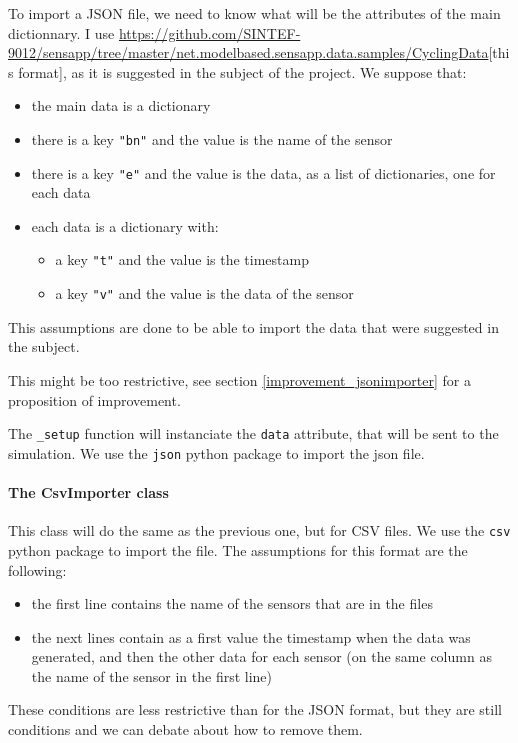 To import a JSON file, we need to know what will be the attributes of the main dictionnary. I use \url{https://github.com/SINTEF-9012/sensapp/tree/master/net.modelbased.sensapp.data.samples/CyclingData}[this format], as it is suggested in the subject of the project. We suppose that:
\begin{itemize}
\item the main data is a dictionary
\item there is a key \verb!"bn"! and the value is the name of the sensor
\item there is a key \verb!"e"! and the value is the data, as a list of dictionaries, one for each data
\item each data is a dictionary with:
      \begin{itemize}
      \item a key \verb!"t"! and the value is the timestamp
      \item a key \verb!"v"! and the value is the data of the sensor
      \end{itemize}
\end{itemize}

This assumptions are done to be able to import the data that were suggested in the subject.

This might be too restrictive, see section \ref{improvement_jsonimporter} for a proposition of improvement.

The \verb!_setup! function will instanciate the \verb!data! attribute, that will be sent to the simulation. We use the \verb!json! python package to import the json file.

\paragraph{The CsvImporter class}

This class will do the same as the previous one, but for CSV files. We use the \verb!csv! python package to import the file. The assumptions for this format are the following:
\begin{itemize}
\item the first line contains the name of the sensors that are in the files
\item the next lines contain as a first value the timestamp when the data was generated, and then the other data for each sensor (on the same column as the name of the sensor in the first line)
\end{itemize}

These conditions are less restrictive than for the JSON format, but they are still conditions and we can debate about how to remove them.

